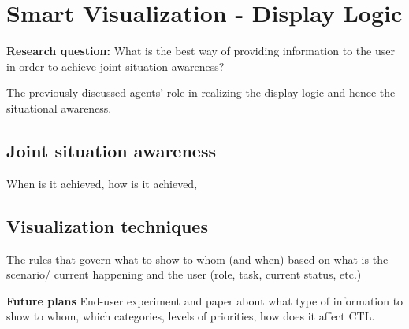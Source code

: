 \section{Smart Visualization - Display Logic}

\textbf{Research question:} What is the best way of providing information to the user in order to achieve joint situation awareness? 

The previously discussed agents' role in realizing the display logic and hence the situational awareness.

\subsection{Joint situation awareness}

When is it achieved, how is it achieved,

\subsection{Visualization techniques}

The rules that govern what to show to whom (and when) based on what is the scenario/ current happening and the user (role, task, current status, etc.) 

\textbf{Future plans} End-user experiment and paper about what type of information to show to whom, which categories, levels of priorities, how does it affect CTL.
  
  
  
  
  
  